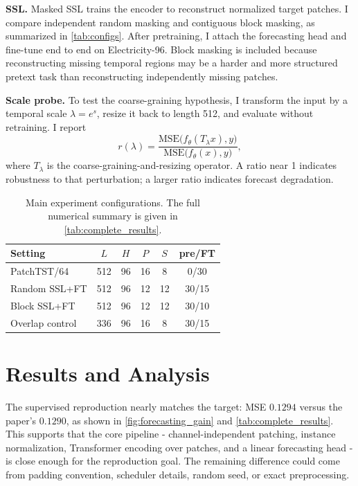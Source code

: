 \documentclass[11pt,twocolumn]{article}
\begin{document}
\textbf{SSL.} Masked SSL trains the encoder to reconstruct normalized target patches. I compare independent random masking and contiguous block masking, as summarized in \autoref{tab:configs}. After pretraining, I attach the forecasting head and fine-tune end to end on Electricity-96. Block masking is included because reconstructing missing temporal regions may be a harder and more structured pretext task than reconstructing independently missing patches.

\textbf{Scale probe.} To test the coarse-graining hypothesis, I transform the input by a temporal scale $\lambda=e^s$, resize it back to length 512, and evaluate without retraining. I report
\begin{equation}
\label{eq:scale_ratio}
r(\lambda)=
\frac{\mathrm{MSE}\bigl(f_\theta(T_\lambda x),y\bigr)}
{\mathrm{MSE}\bigl(f_\theta(x),y\bigr)},
\end{equation}
where $T_\lambda$ is the coarse-graining-and-resizing operator. A ratio near 1 indicates robustness to that perturbation; a larger ratio indicates forecast degradation.

\begin{table}[H]
\centering
\small
\begin{tabular}{lccccc}
\toprule
Setting & $L$ & $H$ & $P$ & $S$ & pre/FT \\
\midrule
PatchTST/64 & 512 & 96 & 16 & 8 & 0/30 \\
Random SSL+FT & 512 & 96 & 12 & 12 & 30/15 \\
Block SSL+FT & 512 & 96 & 12 & 12 & 30/10 \\
Overlap control & 336 & 96 & 16 & 8 & 30/15 \\
\bottomrule
\end{tabular}
\caption{Main experiment configurations. The full numerical summary is given in \autoref{tab:complete_results}.}
\label{tab:configs}
\end{table}

\section{Results and Analysis}
The supervised reproduction nearly matches the target: MSE $0.1294$ versus the paper's $0.1290$, as shown in \autoref{fig:forecasting_gain} and \autoref{tab:complete_results}. This supports that the core pipeline - channel-independent patching, instance normalization, Transformer encoding over patches, and a linear forecasting head - is close enough for the reproduction goal. The remaining difference could come from padding convention, scheduler details, random seed, or exact preprocessing.
\end{document}
